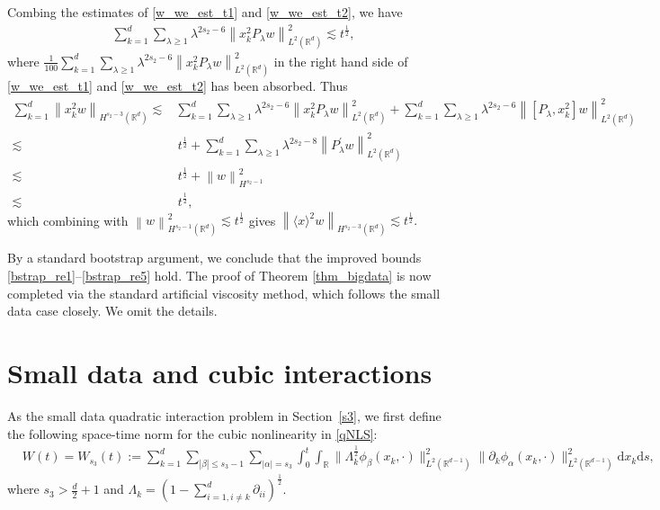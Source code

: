 \documentclass[10pt,twoside,a4paper]{article}
\numberwithin{equation}{section}\allowdisplaybreaks
\def\leq{\leqslant}
\def\geq{\geqslant}
\begin{document}
	Combing the estimates of \eqref{w_we_est_t1} and \eqref{w_we_est_t2}, we have 
	\begin{align*}
		\sum_{k=1}^d  \sum_{\lambda \geq 1} \lambda^{2 s_2-6 } \left\| x_k^2 P_{\lambda }  w\right\|_{L^{2}(\mathbb{R}^d)}^2 \lesssim t^{\frac 12},
	\end{align*}
	where $\frac{1}{100} \sum_{k=1}^d  \sum_{\lambda \geq 1} \lambda^{2 s_2-6 } \left\| x_k^2 P_{\lambda }  w\right\|_{L^{2}(\mathbb{R}^d)}^2 $  in the right hand side of  \eqref{w_we_est_t1} and \eqref{w_we_est_t2} has been absorbed. Thus
	\begin{align*}
		\sum_{k=1}^d\left\| x_k^2   w\right\|_{H^{s_2-3}(\mathbb{R}^d)} \lesssim & 	\sum_{k=1}^d  \sum_{\lambda \geq 1} \lambda^{2 s_2-6 } \left\| x_k^2 P_{\lambda }  w\right\|_{L^{2}(\mathbb{R}^d)}^2  +	\sum_{k=1}^d  \sum_{\lambda \geq 1} \lambda^{2 s_2-6 } \left\| [P_{\lambda },x_k^2  ] w\right\|_{L^{2}(\mathbb{R}^d)}^2\\
		\lesssim& \,t^{\frac 12}+  	\sum_{k=1}^d  \sum_{\lambda \geq 1} \lambda^{2 s_2-8 } \left\|  P_{\lambda}^\prime  w\right\|_{L^{2}(\mathbb{R}^d)}^2\\
		\lesssim& \,t^{\frac 12} +\left\|w\right\|_{H^{s_2-1}}^2 \\
		\lesssim &\,t^{\frac 12},
	\end{align*}
	which combining with $\left\| w\right\|^2_{H^{s_2-1}(\mathbb{R}^d)} \lesssim t^{\frac 12}$ gives $\left\| \langle x \rangle^2   w\right\|_{H^{s_2-3}(\mathbb{R}^d)} \lesssim t^{\frac 12}.$ 
	
	By a standard bootstrap argument, we conclude that the improved bounds \eqref{bstrap_re1}--\eqref{bstrap_re5} hold. The proof of Theorem \ref{thm_bigdata} is now completed via the standard artificial viscosity method, which follows the small data case closely. We omit the  details.
	


\section{Small data and cubic interactions} \label{s4}


As the small data  quadratic interaction problem in Section~\ref{s3}, we first define the following space-time norm for the cubic nonlinearity in \eqref{qNLS}:
\begin{align*}
	&W(t)=W_{s_3}(t)
:=\sum_{k=1}^d\sum_{|\beta|\leq s_3-1} \sum_{|\alpha|=s_3}\int_0^t \int_{\mathbb{R}} \|\Lambda_k^{\frac 12}\phi_{\beta}(x_k,\cdot)\|_{L^2(\mathbb{R}^{d-1})}^2  \|\partial_k \phi_{\alpha}(x_k,\cdot)\|_{L^2(\mathbb{R}^{d-1})}^2 \mathrm{d} x_k \mathrm{d} s,\nonumber
\end{align*}
where $ s_3>\frac d2+1 $ and $ \Lambda_k= \left(1-\sum_{i=1,i\neq k}^d \partial_{ii}\right)^{\frac12} $.
\end{document}
